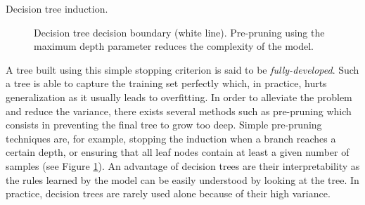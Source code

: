 \begin{algorithm}[t]
  \SetAlgoLined

  \;
\caption{Decision tree induction.}
\label{algo:backml:dtinduction}
\end{algorithm}

\begin{figure}
  \centering
  \caption{Decision tree decision boundary (white line). Pre-pruning using the maximum depth parameter reduces the complexity of the model.}
  \label{fig:backml:dt_boundary}
\end{figure}

A tree built using this simple stopping criterion is said to be \textit{fully-developed}.
Such a tree is able to capture the training set perfectly which, in practice,
hurts generalization as it usually leads to overfitting. In order to alleviate
the problem and reduce the variance, there exists several methods such as pre-pruning
which consists in preventing the final tree to grow too deep. Simple
pre-pruning techniques are, for example, stopping the induction when a branch
reaches a certain depth, or ensuring that all leaf nodes contain at least a given
number of samples (see Figure \ref{fig:backml:dt_boundary}). An advantage of
decision trees are their interpretability as the rules learned by the model can
be easily understood by looking at the tree. In practice, decision trees are rarely
used alone because of their high variance.


